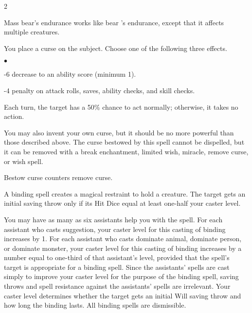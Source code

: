 \begin{multicols}{2}
\begin{small}
\noindent Mass bear's endurance works like bear 's endurance, except that it affects multiple creatures.

\noindent You place a curse on the subject. Choose one of the following three effects.

\begin{list}{$\bullet$}{\itemspace}
  \item -6 decrease to an ability score (minimum 1).
  \item -4 penalty on attack rolls, saves, ability checks, and skill checks.
  \item Each turn, the target has a 50\% chance to act normally; otherwise, it takes no action.
\end{list}

\smallskip\noindent You may also invent your own curse, but it should be no more powerful than those described above. The curse bestowed by this spell cannot be dispelled, but it can be removed with a break enchantment, limited wish, miracle, remove curse, or wish spell.

\smallskip\noindent Bestow curse counters remove curse.

\noindent A binding spell creates a magical restraint to hold a creature. The target gets an initial saving throw only if its Hit Dice equal at least one-half your caster level.

\smallskip\noindent You may have as many as six assistants help you with the spell. For each assistant who casts suggestion, your caster level for this casting of binding increases by 1. For each assistant who casts dominate animal, dominate person, or dominate monster, your caster level for this casting of binding increases by a number equal to one-third of that assistant's level, provided that the spell's target is appropriate for a binding spell. Since the assistants' spells are cast simply to improve your caster level for the purpose of the binding spell, saving throws and spell resistance against the assistants' spells are irrelevant. Your caster level determines whether the target gets an initial Will saving throw and how long the binding lasts. All binding spells are dismissible.


\end{small}
\end{multicols}
